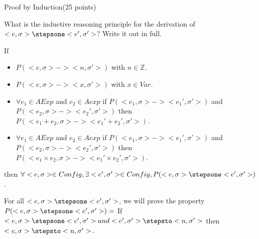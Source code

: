 \documentclass{article}
\begin{document}
%
%
%

\newpage
\begin{question}{Proof by Induction}{(25 points)}


  
  \begin{subquestion}
  	 What is the inductive reasoning principle for the derivation of $<e, \sigma> \stepsone <e', \sigma'>$? Write it out in full.
  	 
  	 If
  	 \begin{itemize}
  	 \item $P(<e, \sigma> -> <n, \sigma'>)$ with $n \in \mathbb{Z}$.
  	 \item $P(<e, \sigma> -> <x, \sigma'>)$ with $x \in Var$.
   	 \item $\forall e_1 \in AExp$ and $e_2 \in Aexp$ if $P(<e_1, \sigma> -> <e_1', \sigma'>)$ and $P(<e_2, \sigma> -> <e_2', \sigma'>)$ then $P(<e_1+e_2, \sigma> -> <e_1'+e_2', \sigma'>)$.
   	 \item $\forall e_1 \in AExp$ and $e_2 \in Aexp$ if $P(<e_1, \sigma> -> <e_1', \sigma'>)$ and $P(<e_2, \sigma> -> <e_2', \sigma'>)$ then $P(<e_1 \times e_2, \sigma> -> <e_1' \times e_2', \sigma'>)$.
  	 \end{itemize}
   	 then $\forall <e, \sigma> \in Config, \exists <e', \sigma'> \in Config, P(<e, \sigma> \stepsone <e', \sigma'>)$.
  	 
  	
  \end{subquestion}

  \begin{subquestion}
    For all $<e,\sigma> \stepsone <e',\sigma'>$, we will prove the property $P(<e,\sigma> \stepsone <e',\sigma'>) =$ If $<e, \sigma> \stepsone <e',\sigma'> and <e', \sigma'> \stepsto <n, \sigma'>$ then $<e, \sigma> \stepsto <n, \sigma'>$.
  \end{subquestion}

  \begin{subquestion}

    
  \end{subquestion}

\end{question}
\end{document}
